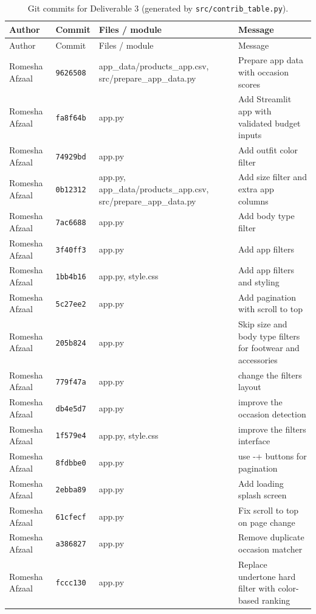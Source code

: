 \begin{longtable}{p{2.6cm}p{1.3cm}p{4.4cm}p{6.2cm}}
\caption{Git commits for Deliverable 3 (generated by \texttt{src/contrib\_table.py}).}\\
\toprule
Author & Commit & Files / module & Message \\
\midrule
\endfirsthead
\toprule
Author & Commit & Files / module & Message \\
\midrule
\endhead
\bottomrule
\endfoot
Romesha Afzaal & \texttt{9626508} & app\_data/products\_app.csv, src/prepare\_app\_data.py & Prepare app data with occasion scores \\
Romesha Afzaal & \texttt{fa8f64b} & app.py & Add Streamlit app with validated budget inputs \\
Romesha Afzaal & \texttt{74929bd} & app.py & Add outfit color filter \\
Romesha Afzaal & \texttt{0b12312} & app.py, app\_data/products\_app.csv, src/prepare\_app\_data.py & Add size filter and extra app columns \\
Romesha Afzaal & \texttt{7ac6688} & app.py & Add body type filter \\
Romesha Afzaal & \texttt{3f40ff3} & app.py & Add app filters \\
Romesha Afzaal & \texttt{1bb4b16} & app.py, style.css & Add app filters and styling \\
Romesha Afzaal & \texttt{5c27ee2} & app.py & Add pagination with scroll to top \\
Romesha Afzaal & \texttt{205b824} & app.py & Skip size and body type filters for footwear and accessories \\
Romesha Afzaal & \texttt{779f47a} & app.py & change the filters layout \\
Romesha Afzaal & \texttt{db4e5d7} & app.py & improve the occasion detection \\
Romesha Afzaal & \texttt{1f579e4} & app.py, style.css & improve the filters interface \\
Romesha Afzaal & \texttt{8fdbbe0} & app.py & use -+ buttons for pagination \\
Romesha Afzaal & \texttt{2ebba89} & app.py & Add loading splash screen \\
Romesha Afzaal & \texttt{61cfecf} & app.py & Fix scroll to top on page change \\
Romesha Afzaal & \texttt{a386827} & app.py & Remove duplicate occasion matcher \\
Romesha Afzaal & \texttt{fccc130} & app.py & Replace undertone hard filter with color-based ranking \\

\end{longtable}

